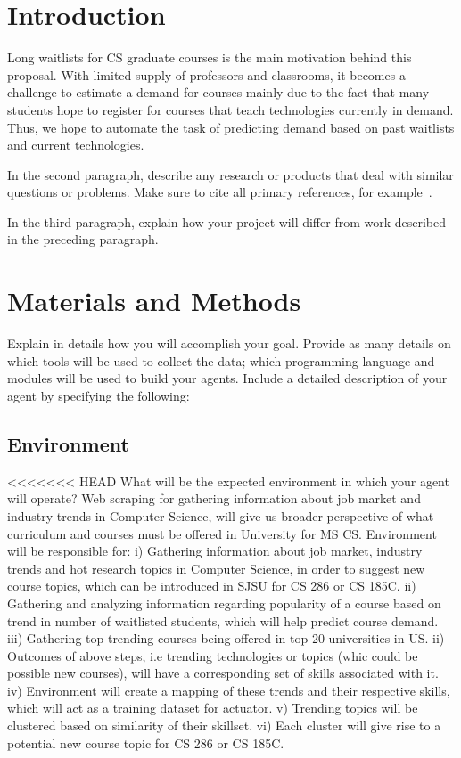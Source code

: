 \documentclass{article}
\begin{document}
\section{Introduction}

Long waitlists for CS graduate courses is the main motivation behind this proposal. With limited supply of professors and classrooms, it becomes a challenge to estimate a demand for courses mainly due to the fact that many students hope to register for courses that teach technologies currently in demand. Thus, we hope to automate the task of predicting demand based on past waitlists and current technologies. 

In the second paragraph, describe any research or products that deal with similar questions or problems.  Make sure to cite all primary references, for example~\cite{einstein}.

In the third paragraph, explain how your project will differ from work described in the preceding paragraph. 

\section{Materials and Methods}
Explain in details how you will accomplish your goal.  Provide as many details on which tools will be used to collect the data; which programming language and modules will be used to build your agents.
Include a detailed description of your agent by specifying the following:
\subsection{Environment}
<<<<<<< HEAD
What will be the expected environment in which your agent will operate?
Web scraping for gathering information about job market and industry trends in Computer Science, will give us broader perspective of what curriculum and courses must be offered in University for MS CS.
Environment will be responsible for:
i)  Gathering information about job market, industry trends and hot research topics in Computer Science, in order to suggest new course topics, which can be introduced in SJSU for CS 286 or CS 185C.
ii) Gathering and analyzing information regarding popularity of a course based on trend in number of waitlisted students, which will help predict course demand.
iii) Gathering top trending courses being offered in top 20 universities in US.
ii) Outcomes of above steps, i.e trending technologies or topics (whic could be possible new courses), will have a corresponding set of skills associated with it.
iv) Environment will create a mapping of these trends and their respective skills, which will act as a training dataset for actuator.
v) Trending topics will be clustered based on similarity of their skillset.
vi) Each cluster will give rise to a potential new course topic for CS 286 or CS 185C. 
\end{document}
